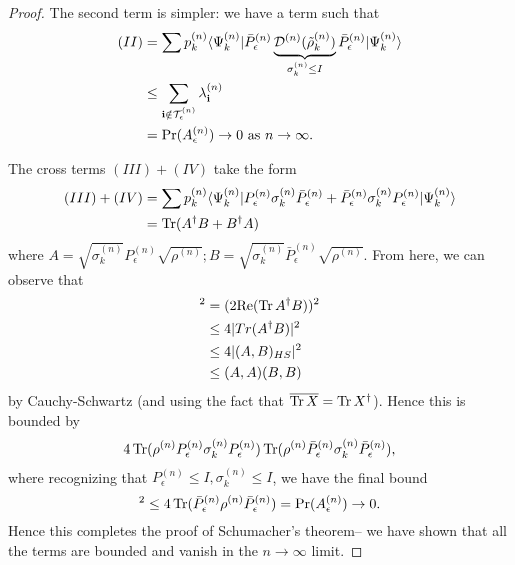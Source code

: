 \begin{proof}
    The second term is simpler: we have a term such that
    \begin{align*}
        (II) &= \sum p_k^{(n)} \langle\Psi_k^{(n)}\rvert\bar P_\epsilon^{(n)} \underbrace{\mathcal{D}^{(n)} (\tilde \rho_k^{(n)})}_{\sigma_k^{(n)}\leq I} \bar P_\epsilon^{(n)} \lvert\Psi_k^{(n)}\rangle\\
            &\leq \sum_{\boldsymbol{\mathbf{i}} \notin \mathcal T_\epsilon^{(n)}}\lambda_{\boldsymbol{\mathbf{i}}}^{(n)}\\
            &= \text{Pr}(A_\epsilon^{(n)})\to 0\text{ as } n\to\infty.
     \end{align*}
     
     The cross terms $(III)+(IV)$ take the form
     \begin{align*}
         (III)+(IV) &= \sum p_k^{(n)} \langle\Psi_k^{(n)}\rvert P_\epsilon^{(n)} \sigma_k^{(n)} \bar P_\epsilon^{(n)} + \bar P_\epsilon^{(n)} \sigma_k^{(n)} P_\epsilon^{(n)} \lvert\Psi_k^{(n)}\rangle\\
            &= \operatorname{Tr}(A^\dagger B+B^\dagger A)
     \end{align*}
     where $A=\sqrt{\sigma_k^{(n)}}P_\epsilon^{(n)}\sqrt{\rho^{(n)}}; B=\sqrt{\sigma_k^{(n)}}\bar P_\epsilon^{(n)}\sqrt{\rho^{(n)}}$. From here, we can observe that
     \begin{align}
         [\Tr(A^\dagger B + B^\dagger A)]^2 &= (2\text{Re}(\Tr A^\dagger B))^2\\
         &\leq 4|Tr(A^\dagger B)|^2\\
         &\leq 4|(A,B)_{HS}|^2\\
         &\leq (A,A)(B,B)
     \end{align}
     by Cauchy-Schwartz (and using the fact that $\overline{\operatorname{Tr} X}=\operatorname{Tr} X^\dagger$).
     Hence this is bounded by
     \begin{equation}
         4 \operatorname{Tr}(\rho^{(n)} P_\epsilon^{(n)} \sigma_k^{(n)} P_\epsilon^{(n)})\operatorname{Tr} (\rho^{(n)} \bar P_\epsilon^{(n)} \sigma_k^{(n)} \bar P_\epsilon^{(n)}),
     \end{equation}
     where recognizing that $P_\epsilon^{(n)}\leq I, \sigma_k^{(n)} \leq I$, we have the final bound
     \begin{equation}
         [\Tr(A^\dagger B + B^\dagger A)]^2 \leq 4 \Tr(\bar P_\epsilon^{(n)} \rho^{(n)} \bar P_\epsilon^{(n)}) =\text{Pr}(A_\epsilon^{(n)})\to 0.
     \end{equation}
     Hence this completes the proof of Schumacher's theorem-- we have shown that all the terms are bounded and vanish in the $n\to\infty$ limit.
\end{proof}

